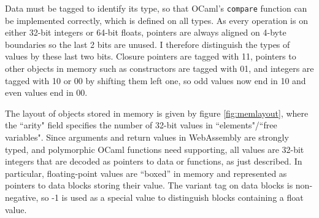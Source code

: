 Data must be tagged to identify its type, so that OCaml's \verb|compare| function can be implemented correctly, which is defined on all types. As every operation is on either 32-bit integers or 64-bit floats, pointers are always aligned on 4-byte boundaries so the last 2 bits are unused. I therefore distinguish the types of values by these last two bits. Closure pointers are tagged with 11, pointers to other objects in memory such as constructors are tagged with 01, and integers are tagged with 10 or 00 by shifting them left one, so odd values now end in 10 and even values end in 00. 

The layout of objects stored in memory is given by figure \ref{fig:memlayout}, where the ``arity" field specifies the number of 32-bit values in ``elements"/``free variables". Since arguments and return values in WebAssembly are strongly typed, and polymorphic OCaml functions need supporting, all values are 32-bit integers that are decoded as pointers to data or functions, as just described. In particular, floating-point values are ``boxed'' in memory and represented as pointers to data blocks storing their value. The variant tag on data blocks is non-negative, so -1 is used as a special value to distinguish blocks containing a float value.\\


